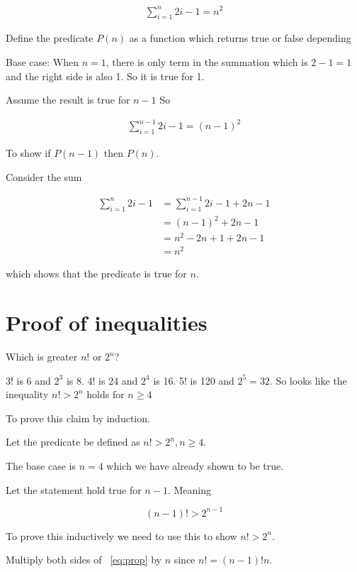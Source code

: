 \documentclass[12pt]{article}
\begin{document}
\begin{align*}
\sum_{i=1}^n 2i - 1 = n^2
\end{align*}

Define the predicate $P(n)$ as a function which returns true or false depending 

Base case: When $n=1$, there is only term in the summation which is $ 2 - 1 = 1$ and the right side is also 1. So it is true for 1.

Assume the result is true for $n-1$ So 

\begin{align*}
\sum_{i=1}^{n-1} 2i - 1 = (n-1)^2
\end{align*}

To show if $P(n-1)$ then $P(n)$.

Consider the sum 

\begin{align*}
\sum_{i=1}^n 2i - 1 &= \sum_{i=1}^{n-1} 2i - 1 + 2n - 1 \\
&= (n-1)^2 + 2n - 1 \tag{using P(n-1) true}\\
&= n^2 - 2n + 1 + 2n - 1 \\
&= n^2
\end{align*}

which shows that the predicate is true for $n$.

\section*{Proof of inequalities}

Which is greater $n!$ or $2^n$? 

3! is 6 and $2^3$ is 8. 4! is 24 and $2^4$ is 16. 5! is 120 and $2^5=32$. So looks like the inequality $n! > 2^n$ holds for $n \ge 4$

To prove this claim by induction.

Let the predicate be defined as $n! > 2^n, n \ge 4$.

The base case is $n = 4$ which we have already shown to be true.

Let the statement hold true for $n-1$. Meaning 

\begin{equation} \label{eq:prop}
(n-1)! > 2^{n-1}
\end{equation}

To prove this inductively we need to use this to show $n! > 2^n$.

Multiply both sides of ~\ref{eq:prop} by $n$ since $n! = (n-1)!n$.
\end{document}
